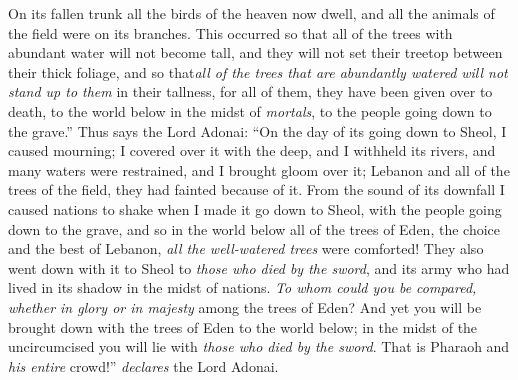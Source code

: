 \begin{biblechapter}
\verse On its fallen trunk all the birds of the heaven now dwell, and all the animals of the field were on its branches.
\verse This occurred so that all of the trees with abundant water will not become tall, and they will not set their treetop between their thick foliage, and so that\textit{all of the trees that are abundantly watered} \textit{will not stand up to them} in their tallness, for all of them, they have been given over to death, to the world below in the midst of \textit{mortals}, to the people going down to the grave.”
\verse Thus says the Lord Adonai: “On the day of its going down to Sheol, I caused mourning; I covered over it with the deep, and I withheld its rivers, and many waters were restrained, and I brought gloom over it; Lebanon and all of the trees of the field, they had fainted because of it.
\verse From the sound of its downfall I caused nations to shake when I made it go down to Sheol, with the people going down to the grave, and so in the world below all of the trees of Eden, the choice and the best of Lebanon, \textit{all the well-watered trees} were comforted!
\verse They also went down with it to Sheol to \textit{those who died by the sword}, and its army who had lived in its shadow in the midst of nations.
\verse \textit{To whom could you be compared, whether in glory or in majesty} among the trees of Eden? And yet you will be brought down with the trees of Eden to the world below; in the midst of the uncircumcised you will lie with \textit{those who died by the sword}. That is Pharaoh and \textit{his entire} crowd!” \textit{declares} the Lord Adonai.
\end{biblechapter}

